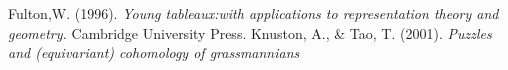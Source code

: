 \begin{thebibliography}{99}
  
   Fulton,W. (1996). \textit{Young tableaux:with applications to representation theory and geometry.} Cambridge University Press.
   Knuston, A., \& Tao, T. (2001). \textit{Puzzles and (equivariant) cohomology of grassmannians} 

\end{thebibliography}